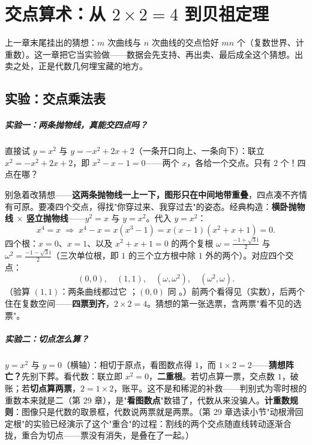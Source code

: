 \chapter{交点算术：从 \texorpdfstring{$2\times2=4$}{2×2=4} 到贝祖定理}

上一章末尾挂出的猜想：$m$ 次曲线与 $n$ 次曲线的交点恰好 $mn$ 个（复数世界、计重数）。这一章把它当实验做——数据会先支持、再出卖、最后成全这个猜想。出卖之处，正是代数几何埋宝藏的地方。

\section{实验：交点乘法表}

\paragraph{实验一：两条抛物线，真能交四点吗？}直接试 $y = x^2$ 与 $y = -x^2 + 2x + 2$（一条开口向上、一条向下）：联立 $x^2 = -x^2 + 2x + 2$，即 $x^2 - x - 1 = 0$——两个 $x$，各给一个交点。只有 $2$ 个！四点在哪？

别急着改猜想——\textbf{这两条抛物线一上一下，图形只在中间地带重叠}，四点凑不齐情有可原。要凑四个交点，得找"你穿过来、我穿过去"的姿态。经典构造：\textbf{横卧抛物线 $\times$ 竖立抛物线}——$y^2 = x$ 与 $y = x^2$。代入 $y = x^2$：
\[
x^4 = x \;\Longrightarrow\; x^4 - x = x(x^3 - 1) = x(x-1)(x^2 + x + 1) = 0 .
\]
四个根：$x = 0$、$x = 1$、以及 $x^2+x+1 = 0$ 的两个复根 $\omega = \tfrac{-1+\sqrt3\mathrm{i}}2$ 与 $\omega^2 = \tfrac{-1-\sqrt3\mathrm{i}}2$（三次单位根，即 $1$ 的三个立方根中除 $1$ 外的两个）。对应四个交点：
\[
(0,0),\quad (1,1),\quad \left(\omega, \omega^2\right),\quad \left(\omega^2, \omega\right).
\]
（验算 $(1,1)$：两条曲线都过它 \checkmark；$(0,0)$ 同 \checkmark。）前两个看得见（实数），后两个住在复数空间——\textbf{四票到齐}，$2\times2 = 4$。猜想的第一张选票，含两票"看不见的选票"。

\paragraph{实验二：切点怎么算？}$y = x^2$ 与 $y = 0$（横轴）：相切于原点，看图数点得 $1$，而 $1\times2 = 2$——\textbf{猜想阵亡？}先别下葬。看代数：联立即 $x^2 = 0$，\textbf{二重根}。若切点算一票，交点数 $1$，破账；若\textbf{切点算两票}，$2 = 1\times2$，账平。这不是和稀泥的补救——判别式为零时根的重数本来就是二（第 29 章），是"\textbf{看图数点}"数错了，代数从来没骗人。\textbf{计重数规则}：图像只是代数的取景框，代数说两票就是两票。（第 29 章选读小节"动根滑回定根"的实验已经演示了这个"重合"的过程：割线的两个交点随直线转动逐渐合拢，重合为切点——票没有消失，是叠在了一起。）

